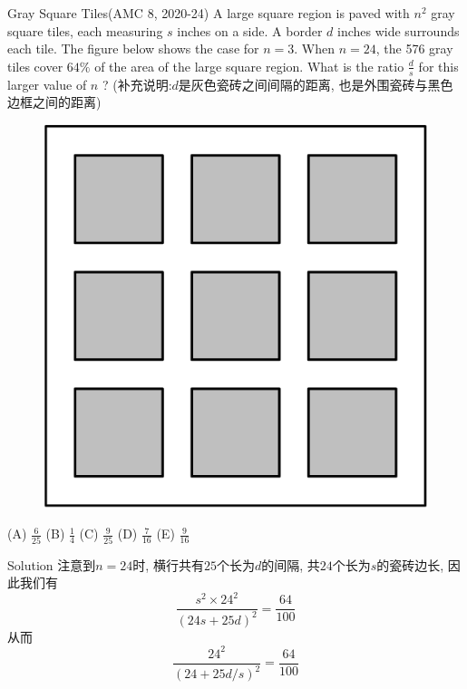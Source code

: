 \documentclass{beamer}
\theoremstyle{definition}
\begin{document}
\begin{frame}{Gray Square Tiles(AMC 8, 2020-24)}
    A large square region is paved with $n^2$ gray square tiles, each measuring $s$ inches on a side. A border $d$ inches wide surrounds each tile. The figure below shows the case for $n=3$. When $n=24$, the 576 gray tiles cover $64 \%$ of the area of the large square region. What is the ratio $\frac{d}{s}$ for this larger value of $n$ ?
    (补充说明:$d$是灰色瓷砖之间间隔的距离, 也是外围瓷砖与黑色边框之间的距离)
    \begin{figure}
        \includegraphics[height=0.3\textheight]{graytiles.png}
    \end{figure}
    (A) $\frac{6}{25}$ (B) $\frac{1}{4}$ (C) $\frac{9}{25}$ (D) $\frac{7}{16}$ (E) $\frac{9}{16}$
\end{frame}
\begin{frame}{Solution}
    注意到$n=24$时, 横行共有$25$个长为$d$的间隔, 共$24$个长为$s$的瓷砖边长, 因此我们有
    \begin{equation*}
        \frac{s^2\times 24^2}{(24s+25d)^2}=\frac{64}{100}
    \end{equation*}
    从而
    \begin{equation*}
        \frac{24^2}{(24+25d/s)^2}=\frac{64}{100}
    \end{equation*}
\end{frame}
\end{document}
